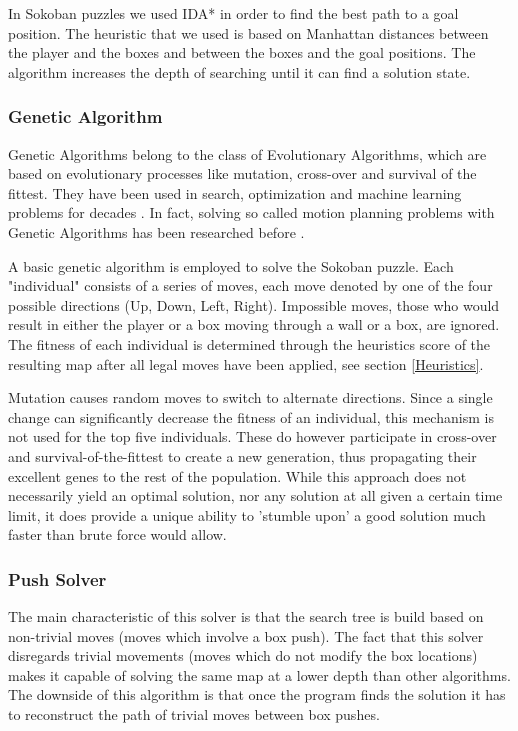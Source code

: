 In Sokoban puzzles we used IDA* in order to find the best path to a goal position. The heuristic that we used is based on Manhattan distances between the player and the boxes and between the boxes and the goal positions. The algorithm increases the depth of searching until it can find a solution state.

\subsubsection{Genetic Algorithm}
Genetic Algorithms belong to the class of Evolutionary Algorithms, which are based on evolutionary processes like mutation, cross-over and survival of the fittest. They have been used in search, optimization and machine learning problems for decades \cite{goldberg1989genetic}. In fact, solving so called motion planning problems with Genetic Algorithms has been researched before \cite{amosgenetic}\cite{coldridge2010genetic}.

A basic genetic algorithm is employed to solve the Sokoban puzzle. Each "individual" consists of a series of moves, each move denoted by one of the four possible directions (Up, Down, Left, Right). Impossible moves, those who would result in either the player or a box moving through a wall or a box, are ignored. The fitness of each individual is determined through the heuristics score of the resulting map after all legal moves have been applied, see section \ref{Heuristics}.

Mutation causes random moves to switch to alternate directions. Since a single change can significantly decrease the fitness of an individual, this mechanism is not used for the top five individuals. These do however participate in cross-over and survival-of-the-fittest to create a new generation, thus propagating their excellent genes to the rest of the population. While this approach does not necessarily yield an optimal solution, nor any solution at all given a certain time limit, it does provide a unique ability to 'stumble upon' a good solution much faster than brute force would allow.

\subsubsection{Push Solver}
The main characteristic of this solver is that the search tree is build based on non-trivial moves (moves which involve a box push).
The fact that this solver disregards trivial movements (moves which do not modify the box locations) makes it capable of solving the same map at a lower depth than other algorithms. The downside of this algorithm is that once the program finds the solution it has to reconstruct the path of trivial moves between box pushes.

